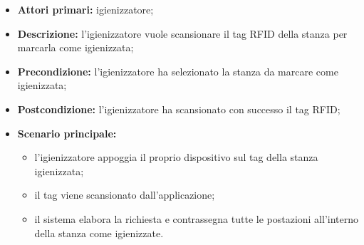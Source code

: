     \begin{itemize}
        \item \textbf{Attori primari:} igienizzatore;
        \item \textbf{Descrizione:} l’igienizzatore vuole scansionare il tag RFID della stanza per marcarla come igienizzata;
        \item \textbf{Precondizione:} l'igienizzatore ha selezionato la stanza da marcare come igienizzata; 
        \item \textbf{Postcondizione:} l'igienizzatore ha scansionato con successo il tag RFID;
        \item \textbf{Scenario principale:} 
            \begin{itemize}	
                \item l'igienizzatore appoggia il proprio dispositivo sul tag della stanza igienizzata;
                \item il tag viene scansionato dall'applicazione;
                \item il sistema elabora la richiesta e contrassegna tutte le postazioni all'interno della stanza come igienizzate.
            \end{itemize}
    \end{itemize}
